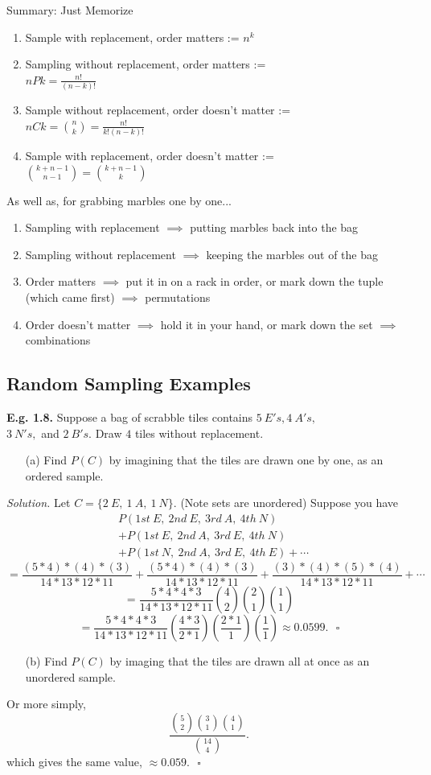 \documentclass[12pt]{book}
\begin{document}
Summary: Just Memorize
\begin{enumerate}
\item Sample with replacement, order matters := $n^k$
\item Sampling without replacement, order matters := \\$nPk = \frac{n!}{(n-k)!}$
\item Sample without replacement, order doesn't matter := $nCk = {n \choose k} = \frac{n!}{k!(n-k)!}$
\item Sample with replacement, order doesn't matter := \\${k+n-1 \choose n-1}={k+n-1 \choose k}$ 
\end{enumerate}
As well as, for grabbing marbles one by one...
\begin{enumerate}
\item Sampling with replacement $\implies{}$ putting marbles back into the bag
\item Sampling without replacement $\implies{}$ keeping the marbles out of the bag
\item Order matters $\implies{}$ put it in on a rack in order, or mark down the tuple (which came first) $\implies{}$ permutations
\item Order doesn't matter $\implies{}$ hold it in your hand, or mark down the set $\implies{}$ combinations
\end{enumerate}

\subsection{Random Sampling Examples}

\textbf{E.g. 1.8. } Suppose a bag of scrabble tiles contains $5~E's,4~A's,$ \\$3~N's,$ and $2~B's$. Draw $4$ tiles without replacement.
\begin{itemize} \item[(a)] Find $P(C)$ by imagining that the tiles are drawn one by one, as an ordered sample.\end{itemize}
\textit{Solution. }
Let $C = \{ 2~E,~1~A,~1~N \}$. (Note sets are unordered)
Suppose you have
\begin{align*}
&P(1st~E,~2nd~E,~3rd~A,~4th~N)\\
&+ P(1st~E,~2nd~A,~3rd~E,~4th~N)\\
&+ P(1st~N,~2nd~A,~3rd~E,~4th~E) + \cdots
\end{align*}
$$ = \frac{(5*4)*(4)*(3)}{14*13*12*11} + \frac{(5*4)*(4)*(3)}{14*13*12*11} + \frac{(3)*(4)*(5)*(4)}{14*13*12*11}+\cdots$$
$$=\frac{5*4*4*3}{14*13*12*11} {4 \choose 2}{2\choose 1}{1\choose 1}$$
$$=\frac{5*4*4*3}{14*13*12*11} \left( \frac{4*3}{2*1} \right) \left( \frac{2*1}{1} \right) \left(\frac{1}{1}\right) \approx 0.0599. ~~~\square$$
\begin{itemize}\item[(b)] Find $P(C)$ by imaging that the tiles are drawn all at once as an unordered sample.\end{itemize}
Or more simply,
$$\frac{ {5\choose 2}{3\choose 1}{4\choose 1}  }{{14\choose 4}}.$$
which gives the same value, $\approx 0.059$.$~~~\square$\\
\end{document}
